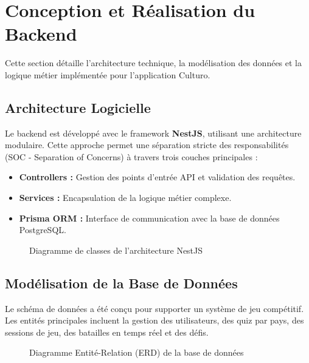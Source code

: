 

\section{Conception et Réalisation du Backend}

Cette section détaille l'architecture technique, la modélisation des données et la logique métier implémentée pour l'application Culturo.

\subsection{Architecture Logicielle}
Le backend est développé avec le framework \textbf{NestJS}, utilisant une architecture modulaire. Cette approche permet une séparation stricte des responsabilités (SOC - Separation of Concerns) à travers trois couches principales :
\begin{itemize}
    \item \textbf{Controllers :} Gestion des points d'entrée API et validation des requêtes.
    \item \textbf{Services :} Encapsulation de la logique métier complexe.
    \item \textbf{Prisma ORM :} Interface de communication avec la base de données PostgreSQL.
\end{itemize}

\begin{figure}[H]
    \centering
     
    \caption{Diagramme de classes de l'architecture NestJS}
    \label{fig:arch_backend}
\end{figure}

\subsection{Modélisation de la Base de Données}
Le schéma de données a été conçu pour supporter un système de jeu compétitif. Les entités principales incluent la gestion des utilisateurs, des quiz par pays, des sessions de jeu, des batailles en temps réel et des défis.

\begin{figure}[H]
    \centering
    
    \caption{Diagramme Entité-Relation (ERD) de la base de données}
    \label{fig:erd}
\end{figure}

